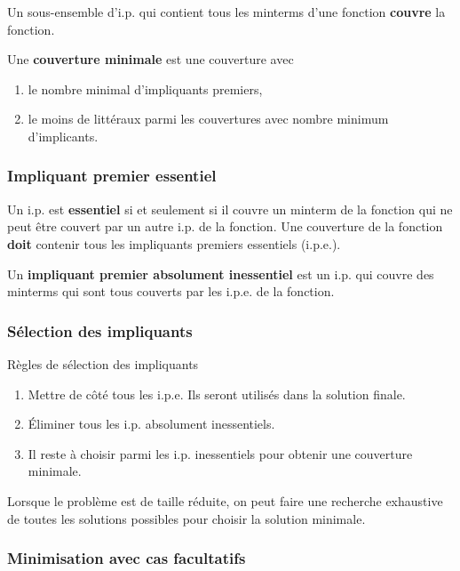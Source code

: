 \documentclass[11pt]{article}
\begin{document}
Un sous-ensemble d'i.p. qui contient tous les minterms d'une fonction
\textbf{couvre} la fonction.

Une \textbf{couverture minimale} est une couverture avec

\begin{enumerate}
\item le nombre minimal d'impliquants premiers,

\item le moins de littéraux parmi les couvertures avec nombre minimum
d'implicants.
\end{enumerate}

\subsubsection{Impliquant premier essentiel}
\label{sec:orga7e1bdc}

Un i.p. est \textbf{essentiel} si et seulement si il couvre un minterm de la
fonction qui ne peut être couvert par un autre i.p. de la fonction.
Une couverture de la fonction \textbf{doit} contenir tous les impliquants
premiers essentiels (i.p.e.).

Un \textbf{impliquant premier absolument inessentiel} est un i.p. qui couvre
des minterms qui sont tous couverts par les i.p.e. de la fonction.

\subsubsection{Sélection des impliquants}
\label{sec:orgb62c39b}

Règles de sélection des impliquants

\begin{enumerate}
\item Mettre de côté tous les i.p.e. Ils seront utilisés dans la solution
finale.

\item Éliminer tous les i.p. absolument inessentiels.

\item Il reste à choisir parmi les i.p. inessentiels pour obtenir une
couverture minimale.
\end{enumerate}

Lorsque le problème est de taille réduite, on peut faire une recherche
exhaustive de toutes les solutions possibles pour choisir la solution
minimale.

\subsubsection{Minimisation avec cas facultatifs}
\label{sec:org1c0d41f}
\end{document}
